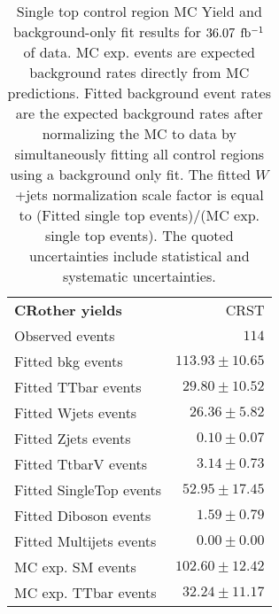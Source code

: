 

\begin{table}[h!]
\caption[Single top control region MC Yield and background-only fit results for $\intlumi$ $\ifb$ of data]{Single top control region MC Yield and background-only fit results for $\intlumi$ $\ifb$ of data. MC exp. events are expected background rates directly from MC predictions.  Fitted background event rates are the expected background rates after normalizing the MC to data by simultaneously fitting all control regions using a background only fit.  The fitted $W$+jets normalization scale factor is equal to (Fitted single top events)/(MC exp. single top events). The quoted uncertainties include statistical and systematic uncertainties. }
\label{table.bkgonly.CRST}
\begin{center}
\setlength{\tabcolsep}{0.0pc}
{\small
\begin{tabular*}{\textwidth}{@{\extracolsep{\fill}}lr}
\noalign{\smallskip}\hline\noalign{\smallskip}
{\bf CRother yields}             & CRST              \\[-0.05cm]
\noalign{\smallskip}\hline\noalign{\smallskip}
Observed events                & $114$                    \\
\noalign{\smallskip}\hline\noalign{\smallskip}
Fitted bkg events                & $113.93 \pm 10.65$              \\
\noalign{\smallskip}\hline\noalign{\smallskip}
        Fitted TTbar events              & $29.80 \pm 10.52$              \\
        Fitted Wjets events           & $26.36 \pm 5.82$              \\
        Fitted Zjets events              & $0.10 \pm 0.07$              \\
        Fitted TtbarV events             & $3.14 \pm 0.73$              \\
        Fitted SingleTop events            & $52.95 \pm 17.45$              \\
        Fitted Diboson events                & $1.59 \pm 0.79$              \\
        Fitted Multijets events                & $0.00 \pm 0.00$              \\
 \noalign{\smallskip}\hline\noalign{\smallskip}
MC exp. SM events                    & $102.60 \pm 12.42$              \\
\noalign{\smallskip}\hline\noalign{\smallskip}
        MC exp. TTbar events             & $32.24 \pm 11.17$              \\

\end{tabular*}}
\end{center}
\end{table}
